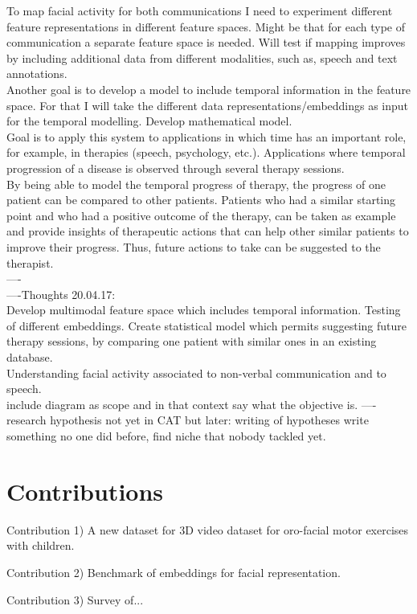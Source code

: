 To map facial activity for both communications I need to experiment different feature representations in different feature spaces. Might be that for each type of communication a separate feature space is needed. Will test if mapping improves by including additional data from different modalities, such as, speech and text annotations. \\

Another goal is to develop a model to include temporal information in the feature space. For that I will take the different data representations/embeddings as input for the temporal modelling. Develop mathematical model.\\

Goal is to apply this system to applications in which time has an important role, for example, in therapies (speech, psychology, etc.). Applications where temporal progression of a disease is observed through several therapy sessions.\\

By being able to model the temporal progress of therapy, the progress of one patient can be compared to other patients. Patients who had a similar starting point and who had a positive outcome of the therapy, can be taken as example and provide insights of therapeutic actions that can help other similar patients to improve their progress. Thus, future actions to take can be suggested to the therapist.   
\\
----\\

----Thoughts 20.04.17:\\
Develop multimodal feature space which includes temporal information. Testing of different embeddings. Create statistical model which permits suggesting future therapy sessions, by comparing one patient with similar ones in an existing database.\\
Understanding facial activity associated to non-verbal communication and to speech.\\ include diagram as scope and in that context say what the objective is.
----\\
research hypothesis not yet in CAT but later: writing of hypotheses write something no one did before, find niche that nobody tackled yet. 

\section{Contributions}

Contribution 1) A new dataset for 3D video dataset for oro-facial motor exercises with children.

Contribution 2) Benchmark of embeddings for facial representation.

Contribution 3) Survey of...


